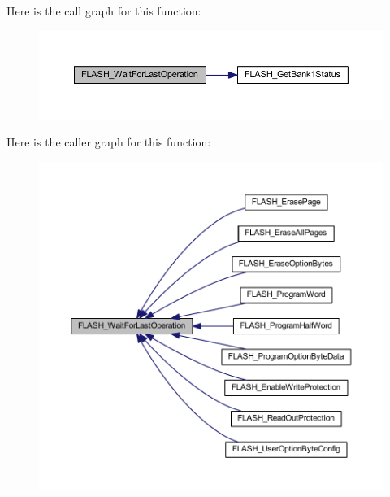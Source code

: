Here is the call graph for this function\+:
\nopagebreak
\begin{figure}[H]
\begin{center}
\leavevmode
\includegraphics[width=350pt]{group___f_l_a_s_h___exported___functions_ga2ad803999ae93ec03700983c59cae264_cgraph}
\end{center}
\end{figure}
Here is the caller graph for this function\+:
\nopagebreak
\begin{figure}[H]
\begin{center}
\leavevmode
\includegraphics[width=350pt]{group___f_l_a_s_h___exported___functions_ga2ad803999ae93ec03700983c59cae264_icgraph}
\end{center}
\end{figure}
